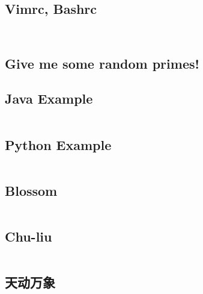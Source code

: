 \documentclass[titlepage, a4paper]{article}
\begin{document}
\begin{multicols}{2}
\begin{spacing}{0.6}
				\subsection{Vimrc, Bashrc}
				\inputminted{vim}{src/Miscellany/vimrc}
				\inputminted{sh}{src/Miscellany/bashrc}
				\subsection{Give me some random primes!}
				\texttt{}
				\newpage
			\subsection*{Java Example}
				\inputminted{java}{src/Miscellany/Main2.java}
			\subsection*{Python Example}
				\inputminted{python}{src/Miscellany/test.py}
			\subsection*{Blossom}
				\inputminted{python}{src/TreeandGraph/Blossom.cpp}
			\subsection*{Chu-liu}
				\inputminted{cpp}{src/TreeandGraph/最小树形图.cpp}
			\subsection*{天动万象}
				\inputminted{cpp}{src/yzh/ByteCampA3.cpp}
		\end{spacing}
		\endgroup
	\end{multicols}
	
\end{document}
